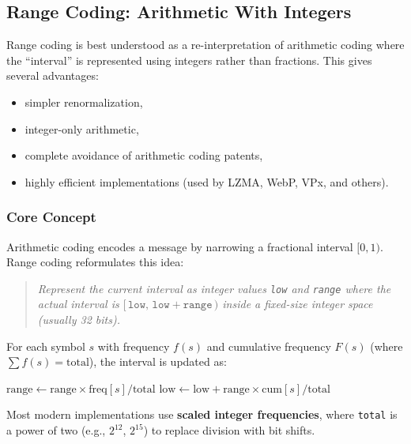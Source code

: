 \subsection{Range Coding: Arithmetic With Integers}

Range coding is best understood as a re-interpretation of arithmetic coding where the ``interval'' is represented using integers rather than fractions.  
This gives several advantages:

\begin{itemize}
    \item simpler renormalization,
    \item integer-only arithmetic,
    \item complete avoidance of arithmetic coding patents,
    \item highly efficient implementations (used by LZMA, WebP, VPx, and others).
\end{itemize}

\subsubsection{Core Concept}

Arithmetic coding encodes a message by narrowing a fractional interval $[0,1)$.  
Range coding reformulates this idea:

\begin{quote}
\emph{Represent the current interval as integer values \texttt{low} and \texttt{range} where the actual interval is $[\,\texttt{low},\, \texttt{low} + \texttt{range}\,)$ inside a fixed-size integer space (usually 32 bits).}
\end{quote}

For each symbol $s$ with frequency $f(s)$ and cumulative frequency $F(s)$ (where $\sum f(s) = \text{total}$), the interval is updated as:

\begin{algorithm}[H]
\caption{Modern Range Coding Update}
\begin{algorithmic}[1]
    \State $\text{range} \gets \text{range} \times \text{freq}[s] / \text{total}$  
    \State $\text{low} \gets \text{low} + \text{range} \times \text{cum}[s] / \text{total}$  
    \State {}
\EndProcedure
\end{algorithmic}
\end{algorithm}

Most modern implementations use \textbf{scaled integer frequencies}, where \texttt{total} is a power of two (e.g., $2^{12}$, $2^{15}$) to replace division with bit shifts.

